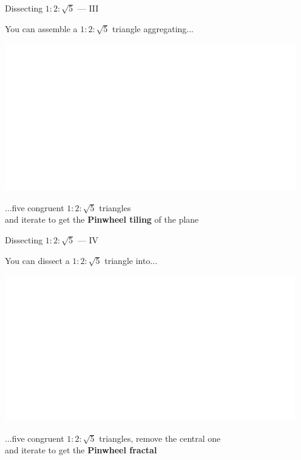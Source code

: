 \documentclass[14pt]{beamer}
\begin{document}

    \begin{frame}{Dissecting $1\!\!:\!\!2\!\!:\!\!\sqrt{5}$ --- III}
        \begin{center}
            You can assemble a $1\!\!:\!\!2\!\!:\!\!\sqrt{5}$ triangle aggregating...

            \bigskip \bigskip

            \includegraphics[height=18ex]{figures/figure006g.pdf}

            \bigskip \bigskip

            ...five congruent $1\!\!:\!\!2\!\!:\!\!\sqrt{5}$ triangles\\and iterate to get the \textbf{Pinwheel tiling} of the plane
        \end{center}
    \end{frame}


    \begin{frame}{Dissecting $1\!\!:\!\!2\!\!:\!\!\sqrt{5}$ --- IV}
        \begin{center}
            You can dissect a $1\!\!:\!\!2\!\!:\!\!\sqrt{5}$ triangle into...

            \bigskip \bigskip

            \includegraphics[height=18ex]{figures/figure006h.pdf}

            \bigskip \bigskip

            ...five congruent $1\!\!:\!\!2\!\!:\!\!\sqrt{5}$ triangles, remove the central one\\and iterate to get the \textbf{Pinwheel fractal}
        \end{center}
    \end{frame}
\end{document}
